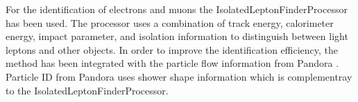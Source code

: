 \begin{comment}
        <parameter name="UseRectangularIsolation" type="bool">true </parameter>

        <parameter name="CosConeAngle" type="float">0.995 </parameter>
        <parameter name="IsolationMinimumConeEnergy" type="float">0 </parameter>
        <parameter name="IsolationMaximumConeEnergy" type="float">10000 </parameter>

        <parameter name="IsolationMinimumTrackEnergy" type="float">15 </parameter>
        <parameter name="IsolationMaximumTrackEnergy" type="float">10000 </parameter>

        <parameter name="UsePolynomialIsolation" type="bool">true </parameter>

        <parameter name="IsolationPolynomialCutA" type="float">0.0 </parameter>
        <parameter name="IsolationPolynomialCutB" type="float">5.7 </parameter>
        <parameter name="IsolationPolynomialCutC" type="float">-50. </parameter>

        <!--Use primitive particle ID based on calorimeter energy deposits-->
        <parameter name="UsePID" type="bool">true </parameter>
        <parameter name="MuonMinEcalToHcalFraction" type="float">0.05 </parameter>
        <parameter name="MuonMaxEcalToHcalFraction" type="float">0.25 </parameter>
        <parameter name="ElectronMinEcalToHcalFraction" type="float">0.9 </parameter>

        <!--Use impact parameter cuts for consistency with primary/secondary track-->
        <parameter name="UseImpactParameter" type="bool">true </parameter>

        <!--Minimum and maximum impact parameters-->
        <parameter name="ImpactParameterMinD0" type="float">0.0 </parameter>
        <parameter name="ImpactParameterMaxD0" type="float">0.02 </parameter>

        <parameter name="ImpactParameterMinZ0" type="float">0.0 </parameter>
        <parameter name="ImpactParameterMaxZ0" type="float">0.03 </parameter>

        <parameter name="ImpactParameterMin3D" type="float">0.0 </parameter>
        <parameter name="ImpactParameterMax3D" type="float">0.04 </parameter>
\end{comment}


For the identification of electrons and muons the IsolatedLeptonFinderProcessor \cite{} has been used. The processor uses a combination of track energy, calorimeter energy, impact parameter, and isolation information to distinguish between light leptons and other objects.
In order to improve the identification efficiency, the method has been integrated with the particle flow information from Pandora \cite{}. Particle ID from Pandora uses shower shape information which is complementray to the IsolatedLeptonFinderProcessor.

